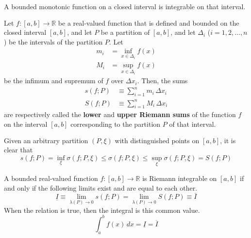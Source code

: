     \begin{corollary}
    A bounded monotonic function on a closed interval is integrable on that interval. 
    \end{corollary}

    \begin{definition}
      Let $f: [a, b] \longrightarrow \mathbb{R}$ be a real-valued function that is defined and bounded on the closed interval $[a, b]$, and let $P$ be a partition of $[a, b]$, and let $\Delta_i$ ($i = 1, 2, \ldots, n$) be the intervals of the partition $P$. Let 
      \begin{align*}
          m_i &= \inf_{x \in \Delta_i} f(x) \\
          M_i &= \sup_{x \in \Delta_i} f(x)
      \end{align*}
      be the infimum and supremum of $f$ over $\Delta x_i$. Then, the sums
      \begin{align*}
          s(f; P) & \equiv \sum_{i = 1}^n m_i \, \Delta x_i \\
          S(f; P) & \equiv \sum_{i=1}^n M_i \, \Delta x_i
      \end{align*}
      are respectively called the \textbf{lower} and \textbf{upper Riemann sums} of the function $f$ on the interval $[a, b]$ corresponding to the partition $P$ of that interval. 

      Given an arbitrary partition $(P, \xi)$ with distinguished points on $[a, b]$, it is clear that
      \[s(f; P) = \inf_{\xi} \sigma(f; P, \xi) \leq \sigma(f; P, \xi) \leq \sup_{\xi} \sigma(f; P, \xi) = S(f; P)\]
    \end{definition}

    \begin{theorem}
    A bounded real-valued function $f: [a, b] \longrightarrow \mathbb{R}$ is Riemann integrable on $[a, b]$ if and only if the following limits exist and are equal to each other. 
    \[\underline{I} \equiv \lim_{\lambda(P) \rightarrow 0} s(f; P) = \lim_{\lambda(P) \rightarrow 0} S(f; P) \equiv \overline{I}\]
    When the relation is true, then the integral is this common value. 
    \[\int_a^b f(x) \,dx = \underline{I} = \overline{I}\]
    \end{theorem}

